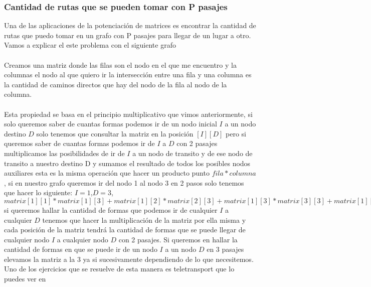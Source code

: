 \subsubsection{Cantidad de rutas que se pueden tomar con P pasajes}
Una de las aplicaciones de la potenciación de matrices es encontrar la cantidad de rutas que puedo
tomar en un grafo con P pasajes para llegar de un lugar a otro.
Vamos a explicar el este problema con el siguiente grafo
\\
\\Creamos una matriz donde las filas son el nodo en el que me encuentro y la columnas el nodo al que quiero ir la intersección entre una fila y una columna es la cantidad de caminos directos que hay del nodo de la fila al nodo de la columna.
\\
\\Esta propiedad se basa en el principio multiplicativo que vimos anteriormente, si solo queremos saber de cuantas formas podemos ir de un nodo inicial $I$ a un nodo destino $D$ solo tenemos que consultar la matriz en la posición $[I][D]$ pero si queremos saber de cuantas formas podemos ir de $I$ a $D$ con 2 pasajes multiplicamos las posibilidades de ir de $I$ a un nodo de transito y de ese nodo de transito a nuestro destino D y sumamos el resultado de todos los posibles nodos auxiliares esta es la misma operación que hacer un producto punto $fila * columna$, si en nuestro grafo queremos ir del nodo 1 al nodo 3 en 2 pasos solo tenemos que hacer lo siguiente:
$I=1$,$D=3$, $matrix[1][1]*matrix[1][3]+matrix[1][2]*matrix[2][3]+matrix[1][3]*matrix[3][3]+matrix[1][4]*matrix[4][3]+matrix[1][5]*matrix[5][3]$
si queremos hallar la cantidad de formas que podemos ir de cualquier $I$ a cualquier $D$ tenemos que hacer la multiplicación  de la matriz por ella misma y cada posición de la matriz tendrá la cantidad de formas que se puede llegar de cualquier nodo $I$ a cualquier nodo $D$ con 2 pasajes.
Si queremos en hallar la cantidad de formas en que se puede ir de un nodo $I$ a un nodo $D$ en 3 pasajes elevamos la matriz a la 3 ya si sucesivamente dependiendo de lo que necesitemos.
\\Uno de los ejercicios que se resuelve de esta manera es teletransport que lo puedes ver en \cite{Teletransport:Online}
